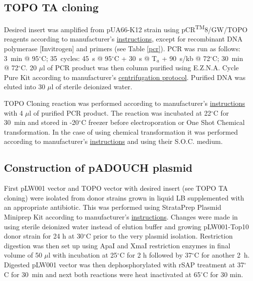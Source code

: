 \subsection{TOPO TA cloning}
Desired insert was amplified from pUA66-K12 strain using pCR\textsuperscript{TM}8/GW/TOPO\textsuperscript{\textregistered} reagents according to manufacturer's \href{https://assets.thermofisher.com/TFS-Assets/LSG/manuals/pcr8gwtopo_man.pdf}{instructions}, except for recombinant  DNA polymerase [Invitrogen] and primers (see Table \ref{pcr}).
PCR was run as follows: 3~min @ 95$^{\circ}$C; 35~cycles: 45~s @ 95$^{\circ}$C + 30~s @ T$_{a}$ + 90~s/kb @ 72$^{\circ}$C; 30~min @ 72$^{\circ}$C.
20 $\mu$l of PCR product was then column purified using E.Z.N.A.\textsuperscript{\textregistered} Cycle Pure Kit according to manufacturer's \href{http://omegabiotek.com/store/wp-content/uploads/2013/09/D6492_D6493-Cycle-Pure-Kit-Combo-Online.pdf}{centrifugation protocol}.
Purified DNA was eluted into 30 $\mu$l of sterile deionized water.

TOPO\textsuperscript{\textregistered} Cloning reaction was performed according to manufacturer's \href{https://assets.thermofisher.com/TFS-Assets/LSG/manuals/pcr8gwtopo_man.pdf}{instructions} with 4 $\mu$l of purified PCR product.
The reaction was incubated at 22$^{\circ}$C for 30~min and stored in -20$^{\circ}$C freezer before electroporation or One Shot\textsuperscript{\textregistered} Chemical transformation.
In the case of using chemical transformation it was performed according to manufacturer's \href{https://assets.thermofisher.com/TFS-Assets/LSG/manuals/pcr8gwtopo_man.pdf}{instructions} and using their S.O.C. medium.

\subsection{Construction of pADOUCH plasmid}
First pLW001 vector and TOPO vector with desired insert (see TOPO TA cloning) were isolated from donor strains grown in liquid LB supplemented with an appropriate antibiotic.
This was performed using StrataPrep Plasmid Miniprep Kit according to manufacturer's \href{https://www.agilent.com/cs/library/usermanuals/public/400766.pdf}{instructions}.
Changes were made in using sterile deionized water instead of elution buffer and growing pLW001-Top10 donor strain for 24 h at 30$^{\circ}$C prior to the very plasmid isolation.
Restriction digestion was then set up using ApaI and XmaI restriction enzymes in final volume of 50 $\mu$l with incubation at 25$^{\circ}$C for 2 h followed by 37$^{\circ}$C for another 2~h.
Digested pLW001 vector was then dephosphorylated with rSAP treatment at 37$^{\circ}$C for 30~min and next both reactions were heat inactivated at 65$^{\circ}$C for 30 min.

